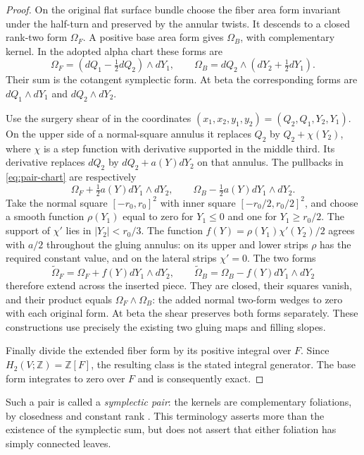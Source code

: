 \documentclass[11pt]{amsart}
\theoremstyle{definition}
\theoremstyle{remark}
\newcommand{\Z}{\mathbb Z}
\begin{document}
\begin{proof}
On the original flat surface bundle choose the fiber area form
invariant under the half-turn and preserved by the annular twists.
It descends to a closed rank-two form $\Omega_F$. A positive base
area form gives $\Omega_B$, with complementary kernel. In the
adopted alpha chart these forms are
\begin{equation}\label{eq:pair-chart}
 \Omega_F=(dQ_1-\tfrac12dQ_2)\wedge dY_1,
 \qquad
 \Omega_B=dQ_2\wedge(dY_2+\tfrac12dY_1).
\end{equation}
Their sum is the cotangent symplectic form. At beta the corresponding
forms are $dQ_1\wedge dY_1$ and $dQ_2\wedge dY_2$.

Use the surgery shear of \cite[Section 2.1]{ADK03} in the coordinates
$(x_1,x_2,y_1,y_2)=(Q_2,Q_1,Y_2,Y_1)$. On the upper side of a
normal-square annulus it replaces $Q_2$ by $Q_2+\chi(Y_2)$,
where $\chi$ is a step function with derivative supported in the
middle third. Its derivative replaces $dQ_2$ by
$dQ_2+a(Y)dY_2$ on that annulus. The pullbacks in
\eqref{eq:pair-chart} are respectively
\[
 \Omega_F+\tfrac12a(Y)dY_1\wedge dY_2,
 \qquad \Omega_B-\tfrac12a(Y)dY_1\wedge dY_2.
\]
Take the normal square $[-r_0,r_0]^2$ with inner square
$[-r_0/2,r_0/2]^2$, and choose a smooth function $\rho(Y_1)$
equal to zero for $Y_1\le0$ and one for $Y_1\ge r_0/2$.
The support of $\chi'$ lies in $|Y_2|<r_0/3$. The function
$f(Y)=\rho(Y_1)\chi'(Y_2)/2$ agrees with $a/2$ throughout the
gluing annulus: on its upper and lower strips $\rho$ has the
required constant value, and on the lateral strips $\chi'=0$.
The two forms
\[
 \widetilde\Omega_F=\Omega_F+f(Y)dY_1\wedge dY_2,
 \qquad
 \widetilde\Omega_B=\Omega_B-f(Y)dY_1\wedge dY_2
\]
therefore extend across the inserted piece. They are closed, their
squares vanish, and their product equals $\Omega_F\wedge\Omega_B$:
the added normal two-form wedges to zero with each original form.
At beta the shear preserves both forms separately. These constructions
use precisely the existing two gluing maps and filling slopes.

Finally divide the extended fiber form by its positive integral over
$F$. Since $H_2(V;\Z)=\Z[F]$, the resulting class is the stated
integral generator. The base form integrates to zero over $F$ and
is consequently exact.
\end{proof}

Such a pair is called a \emph{symplectic pair}: the kernels are
complementary foliations, by closedness and constant rank
\cite{BK06}. This terminology asserts more than the existence of
the symplectic sum, but does not assert that either foliation has
simply connected leaves.
\end{document}
